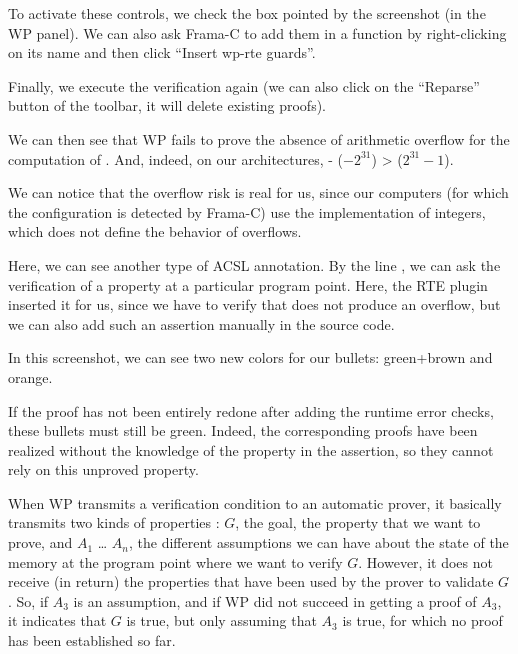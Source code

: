 To activate these controls, we check the box pointed by the screenshot (in
the WP panel). We can also ask Frama-C to add them in a function by
right-clicking on its name and then click ``Insert wp-rte guards''.





Finally, we execute the verification again (we can also click on the
``Reparse'' button of the toolbar, it will delete existing proofs).

We can then see that WP fails to prove the absence of arithmetic
overflow for the computation of . And, indeed, on our
architectures, - ($-2^{31}$) >  ($2^{31}-1$).





\begin{Information}
We can notice that the overflow risk
is real for us, since our computers (for which the
configuration is detected by Frama-C) use the 
implementation of integers, which does not define
the behavior of overflows.
\end{Information}


Here, we can see another type of ACSL annotation. By the line
, we can ask the verification of a
property at a particular program point. Here, the RTE plugin inserted it for
us, since
we have to verify that  does not produce an overflow, but
we can also add such an assertion manually in the source code.



In this screenshot, we can see two new colors for our bullets:
green+brown and orange.



If the proof has not been entirely redone after adding the runtime error
checks, these bullets must still be green. Indeed, the corresponding
proofs have been realized without the knowledge of the property in the
assertion, so they cannot rely on this unproved property.



When WP transmits a verification condition to an automatic prover, it
basically transmits two kinds of properties : $G$, the goal, the
property that we want to prove, and $A_1$ \ldots{} $A_n$, the
different assumptions we can have about the state of the memory at the
program point where we want to verify $G$. However, it does not
receive (in return) the properties that have been used by the prover to
validate $G$. So, if $A_3$ is an assumption, and if WP did not
succeed in getting a proof of $A_3$, it indicates that $G$ is true,
but only assuming that $A_3$ is true, for which no proof has been established
so far.



